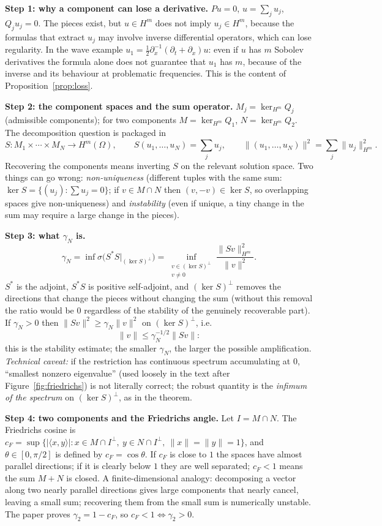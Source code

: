 \documentclass[11pt]{article}
\theoremstyle{plain}
\theoremstyle{definition}
\theoremstyle{remark}
\begin{document}
\medskip\textbf{Step 1: why a component can lose a derivative.} $Pu=0$, $u=\sum_ju_j$, $Q_ju_j=0$. The pieces exist, but $u\in H^m$ does not imply $u_j\in H^m$, because the formulas that extract $u_j$ may involve inverse differential operators, which can lose regularity. In the wave example $u_1=\tfrac12\partial_x^{-1}(\partial_t+\partial_x)u$: even if $u$ has $m$ Sobolev derivatives the formula alone does not guarantee that $u_1$ has $m$, because of the inverse and its behaviour at problematic frequencies. This is the content of Proposition~\ref{prop:loss}.

\medskip\textbf{Step 2: the component spaces and the sum operator.} $M_j=\ker_{H^m}Q_j$ (admissible components); for two components $M=\ker_{H^m}Q_1$, $N=\ker_{H^m}Q_2$. The decomposition question is packaged in
\[
S:M_1\times\cdots\times M_N\to H^m(\Omega),\qquad S(u_1,\dots,u_N)=\sum_ju_j,\qquad \|(u_1,\dots,u_N)\|^2=\sum_j\|u_j\|_{H^m}^2 .
\]
Recovering the components means inverting $S$ on the relevant solution space. Two things can go wrong: \emph{non-uniqueness} (different tuples with the same sum: $\ker S=\{(u_j):\sum u_j=0\}$; if $v\in M\cap N$ then $(v,-v)\in\ker S$, so overlapping spaces give non-uniqueness) and \emph{instability} (even if unique, a tiny change in the sum may require a large change in the pieces).

\medskip\textbf{Step 3: what $\gamma_N$ is.}
\[
\gamma_N=\inf\sigma\big(S^*S|_{(\ker S)^\perp}\big)=\inf_{\substack{v\in(\ker S)^\perp\\v\ne0}}\frac{\|Sv\|_{H^m}^2}{\|v\|^2}.
\]
$S^*$ is the adjoint, $S^*S$ is positive self-adjoint, and $(\ker S)^\perp$ removes the directions that change the pieces without changing the sum (without this removal the ratio would be $0$ regardless of the stability of the genuinely recoverable part). If $\gamma_N>0$ then $\|Sv\|^2\ge\gamma_N\|v\|^2$ on $(\ker S)^\perp$, i.e.
\[
\|v\|\le\gamma_N^{-1/2}\|Sv\|:
\]
this is the stability estimate; the smaller $\gamma_N$, the larger the possible amplification. \emph{Technical caveat:} if the restriction has continuous spectrum accumulating at $0$, ``smallest nonzero eigenvalue'' (used loosely in the text after Figure~\ref{fig:friedrichs}) is not literally correct; the robust quantity is the \emph{infimum of the spectrum} on $(\ker S)^\perp$, as in the theorem.

\medskip\textbf{Step 4: two components and the Friedrichs angle.} Let $I=M\cap N$. The Friedrichs cosine is $c_F=\sup\{|\langle x,y\rangle|:x\in M\cap I^\perp,\ y\in N\cap I^\perp,\ \|x\|=\|y\|=1\}$, and $\theta\in[0,\pi/2]$ is defined by $c_F=\cos\theta$. If $c_F$ is close to $1$ the spaces have almost parallel directions; if it is clearly below $1$ they are well separated; $c_F<1$ means the sum $M+N$ is closed. A finite-dimensional analogy: decomposing a vector along two nearly parallel directions gives large components that nearly cancel, leaving a small sum; recovering them from the small sum is numerically unstable. The paper proves $\gamma_2=1-c_F$, so $c_F<1\iff\gamma_2>0$.
\end{document}
